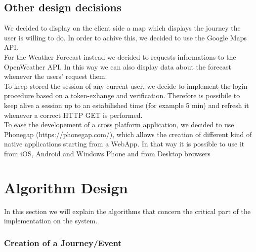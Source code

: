 \documentclass[numbers=noenddot, 12pt, a4paper, oneside]{scrbook}
\begin{document}
\section{Other design decisions}

We decided to display on the client side a map which displays the journey the user is willing to do. In order to achive this, we decided to use the Google Maps API.\\

For the Weather Forecast instead we decided to requests informations to the OpenWeather API. In this way we can also display data about the forecast whenever the users' request them.\\

To keep stored the session of any current user, we decide to implement the login procedure based on a token-exhange and verification. Therefore is possibile to keep alive a session up to an estabilished time (for example 5 min) and refresh it whenever a correct HTTP GET is performed.\\

To ease the developement of a cross platform application, we decided to use Phonegap (https://phonegap.com/), which allows the creation of different kind of native applications starting from a WebApp. In that way it is possible to use it from iOS, Android and Windows Phone and from Desktop browsers

\chapter{Algorithm Design}

In this section we will explain the algorithms that concern the critical part of the implementation on the system.

\subsection*{Creation of a Journey/Event}
\end{document}
